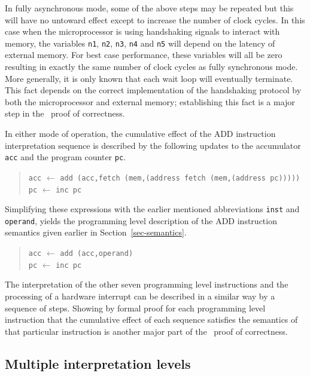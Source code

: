 In fully asynchronous mode,
some of the above steps may be repeated but this will have no
untoward effect except to increase the number of clock cycles.
In this case when the microprocessor is using handshaking signals
to interact with memory,
the variables \verb"n1", \verb"n2", \verb"n3", \verb"n4" and \verb"n5"
will depend on the latency of external memory.
For best case performance,
these variables will all be zero resulting
in exactly the same number of clock cycles as fully
synchronous mode.
More generally,
it is only known that each wait loop will eventually terminate.
This fact depends on the correct implementation of the handshaking protocol
by both the microprocessor and external memory;
establishing this fact is a major step
in the \Tamarack\ proof of correctness.

In either mode of operation,
the cumulative effect of the ADD instruction interpretation sequence
is described by the following updates to the accumulator \verb"acc"
and the program counter \verb"pc".

\begin{quote}
\verb"acc" $\leftarrow$ \verb"add (acc,fetch (mem,(address fetch (mem,(address pc)))))"\\
\verb"pc" $\leftarrow$ \verb"inc pc"
\end{quote}

Simplifying these expressions with the earlier mentioned abbreviations
\verb"inst" and \verb"operand",
yields the programming level description of the ADD instruction semantics
given earlier in Section~\ref{sec-semantics}.

\begin{quote}
\verb"acc" $\leftarrow$ \verb"add (acc,operand)"\\
\verb"pc" $\leftarrow$ \verb"inc pc"
\end{quote}

The interpretation of the other seven programming level instructions
and the processing of a hardware interrupt can be described in
a similar way by a sequence of steps.
Showing by formal proof for each programming level instruction
that the cumulative effect of each sequence
satisfies the semantics of that particular instruction is another
major part
of the \Tamarack\ proof of correctness.

\subsection{Multiple interpretation levels}
\label{sec-multi}

